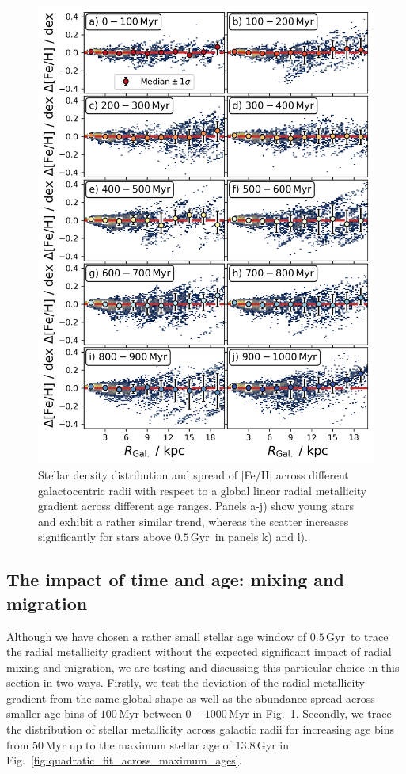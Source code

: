 \documentclass[twocolumn,apj,numberedappendix,appendixfloats]{openjournal}
\newcommand{\nihaoAGEmax}{$0.5\,\mathrm{Gyr}$}
\begin{document}
\begin{CJK*}{UTF8}{gbsn}
\begin{figure}
    \centering
    \includegraphics[width=\columnwidth]{figures/scatter_with_increasing_age.png}
    \caption{Stellar density distribution and spread of [Fe/H] across different galactocentric radii with respect to a global linear radial metallicity gradient across different age ranges. Panels a-j) show young stars and exhibit a rather similar trend, whereas the scatter increases significantly for stars above \nihaoAGEmax\ in panels k) and l).}
    \label{fig:scatter_with_increasing_age}
\end{figure}

\subsection{The impact of time and age: mixing and migration} \label{sec:discussion_time}

Although we have chosen a rather small stellar age window of \nihaoAGEmax\ to trace the radial metallicity gradient without the expected significant impact of radial mixing and migration, we are testing and discussing this particular choice in this section in two ways. Firstly, we test the deviation of the radial metallicity gradient from the same global shape as well as the abundance spread across smaller age bins of $100\,\mathrm{Myr}$ between $0-1000\,\mathrm{Myr}$ in Fig.~\ref{fig:scatter_with_increasing_age}. Secondly, we trace the distribution of stellar metallicity across galactic radii for increasing age bins from $50\,\mathrm{Myr}$ up to the maximum stellar age of $13.8\,\mathrm{Gyr}$ in Fig.~\ref{fig:quadratic_fit_across_maximum_ages}.


\end{CJK*}
\end{document}
